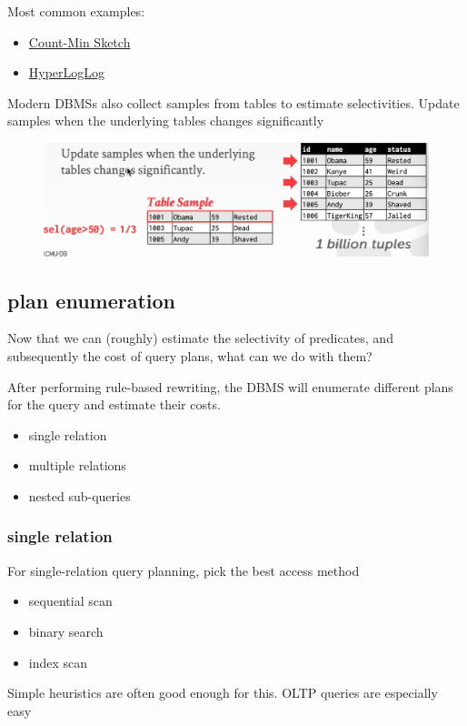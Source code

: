 \documentclass[11pt]{article}
\begin{document}
Most common examples:
\begin{itemize}
\item \uline{Count-Min Sketch}
\item \uline{HyperLogLog}
\end{itemize}


Modern DBMSs also collect samples from tables to estimate selectivities. Update samples when the
underlying tables changes significantly
\begin{figure}[htbp]
\centering
\includegraphics[width=.7\textwidth]{../images/15445/45.png}
\label{}
\end{figure}

\subsection{plan enumeration}
\label{sec:orgc33650c}
Now that we can (roughly) estimate the selectivity of predicates, and subsequently the cost of
query plans, what can we do with them?

After performing rule-based rewriting, the DBMS will enumerate different plans for the query and
estimate their costs.
\begin{itemize}
\item single relation
\item multiple relations
\item nested sub-queries
\end{itemize}
\subsubsection{single relation}
\label{sec:org7d5d742}
For single-relation query planning, pick the best access method
\begin{itemize}
\item sequential scan
\item binary search
\item index scan
\end{itemize}
Simple heuristics are often good enough for this. OLTP queries are especially easy
\end{document}
